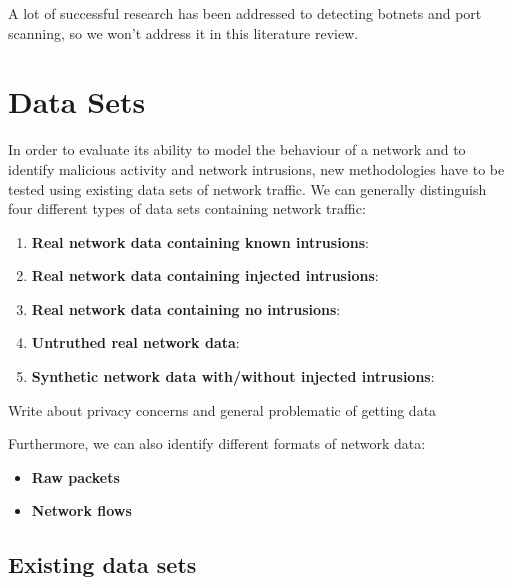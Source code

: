 \documentclass[a4paper,12pt,twoside]{report}
\begin{document}
A lot of successful research has been addressed to detecting botnets and port scanning, so we won't address it in this literature review.

\section{Data Sets}

In order to evaluate its ability to model the behaviour of a network and to identify malicious activity and network intrusions, new methodologies have to be tested using existing data sets of network traffic. We can generally distinguish four different types of data sets containing network traffic:

\begin{enumerate}

\item \textbf{Real network data containing known intrusions}: 

\item \textbf{Real network data containing injected intrusions}:

\item \textbf{Real network data containing no intrusions}:

\item \textbf{Untruthed real network data}:

\item \textbf{Synthetic network data with/without injected intrusions}:

\end{enumerate}

Write about privacy concerns and general problematic of getting data

Furthermore, we can also identify different formats of network data:

\begin{itemize}

\item \textbf{Raw packets}


\item \textbf{Network flows}

\end{itemize}

\subsection{Existing data sets}
\end{document}

